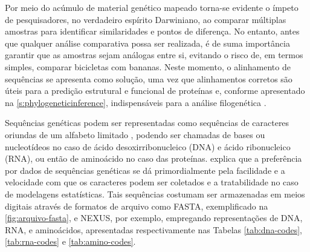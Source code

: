 \documentclass[english,brazilian]{UNISINOSmonografia} %
\begin{document}
Por meio do acúmulo de material genético mapeado torna-se evidente o ímpeto de pesquisadores, no verdadeiro espírito Darwiniano, ao comparar múltiplas amostras para identificar similaridades e pontos de diferença.
No entanto, antes que qualquer análise comparativa possa ser realizada, é de suma importância garantir que as amostras sejam análogas entre si, evitando o risco de, em termos simples, comparar bicicletas com bananas.
Neste momento, o alinhamento de sequências se apresenta como solução, uma vez que alinhamentos corretos são úteis para a predição estrutural e funcional de proteínas e, conforme apresentado na \autoref{s:phylogeneticinference}, indispensáveis para a análise filogenética \cite{biofordummies2007}.




Sequências genéticas podem ser representadas como sequências de caracteres oriundas de um alfabeto limitado \cite{DarribaPHD}, podendo ser chamadas de bases ou nucleotídeos no caso de ácido desoxirribonucleico (DNA) e ácido ribonucleico (RNA), ou então de aminoácido no caso das proteínas.
 explica que a preferência por dados de sequências genéticas se dá primordialmente pela facilidade e a velocidade com que os caracteres podem ser coletados e a tratabilidade no caso de modelagens estatísticas.
Tais sequências costumam ser armazenadas em meios digitais através de formatos de arquivo como FASTA, exemplificado na \autoref{fig:arquivo-fasta}, e NEXUS, por exemplo, empregando representações de DNA, RNA, e aminoácidos, apresentadas respectivamente nas Tabelas \ref{tab:dna-codes}, \ref{tab:rna-codes} e \ref{tab:amino-codes}.


%
%
%
\end{document}
